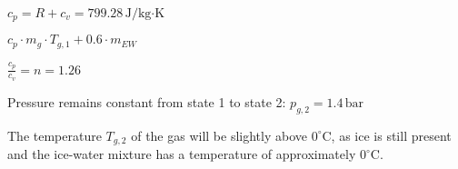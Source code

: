 \( c_p = R + c_v = 799.28 \, \text{J/kg·K} \)  

\( c_p \cdot m_g \cdot T_{g,1} + 0.6 \cdot m_{EW} \)  

\( \frac{c_p}{c_v} = n = 1.26 \)  

Pressure remains constant from state 1 to state 2:  
\( p_{g,2} = 1.4 \, \text{bar} \)  

The temperature \( T_{g,2} \) of the gas will be slightly above \( 0^\circ \text{C} \), as ice is still present and the ice-water mixture has a temperature of approximately \( 0^\circ \text{C} \).